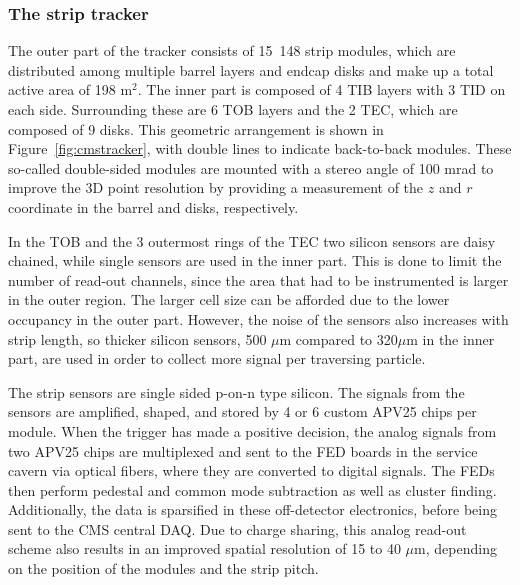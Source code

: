 \subsubsection{The strip tracker}

The outer part of the tracker consists of 15~148 strip modules, which are distributed among multiple barrel layers and endcap disks and make up a total active area of 198 m$^2$. The inner part is composed of 4 \ac{TIB} layers with 3 \ac{TID} on each side. Surrounding these are 6 \ac{TOB} layers and the 2 \ac{TEC}, which are composed of 9 disks. This geometric arrangement is shown in Figure~\ref{fig:cmstracker}, with double lines to indicate back-to-back modules. These so-called double-sided modules are mounted with a stereo angle of 100 mrad to improve the 3D point resolution by providing a measurement of the $z$ and $r$ coordinate in the barrel and disks, respectively.

In the \ac{TOB} and the 3 outermost rings of the \ac{TEC} two silicon sensors are daisy chained, while single sensors are used in the inner part. This is done to limit the number of read-out channels, since the area that had to be instrumented is larger in the outer region. The larger cell size can be afforded  due to the lower occupancy in the outer part. However, the noise of the sensors also increases with strip length, so thicker silicon sensors, 500 $\mu$m compared to 320$\mu$m in the inner part, are used in order to collect more signal per traversing particle.

The strip sensors are single sided p-on-n type silicon. The signals from the sensors are amplified, shaped, and stored by 4 or 6 custom APV25 chips per module. When the trigger has made a positive decision, the analog signals from two APV25 chips are multiplexed and sent to the \ac{FED} boards in the service cavern via optical fibers, where they are converted to digital signals. The \acp{FED} then perform pedestal and common mode subtraction as well as cluster finding. Additionally, the data is sparsified in these off-detector electronics, before being sent to the CMS central \ac{DAQ}. Due to charge sharing, this analog read-out scheme also results in an improved spatial resolution of 15 to 40 $\mu$m, depending on the position of the modules and the strip pitch. 

